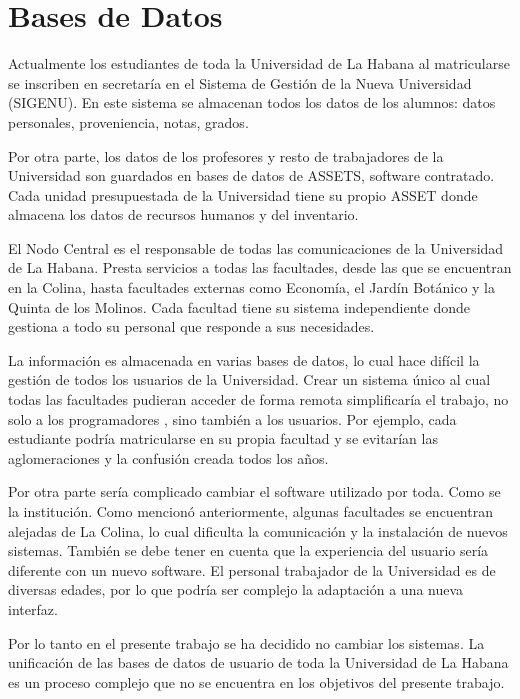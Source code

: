 \section*{Bases de Datos}

Actualmente los estudiantes de toda la Universidad de La Habana al matricularse se inscriben en secretaría en el Sistema de Gestión de la Nueva Universidad (SIGENU). En este sistema se almacenan todos los datos de los alumnos: datos personales, proveniencia, notas, grados.

Por otra parte, los datos de los profesores y resto de trabajadores de la Universidad son guardados en bases de datos de ASSETS, software contratado. Cada unidad presupuestada de la Universidad tiene su propio ASSET donde almacena los datos de recursos humanos y del inventario.

El Nodo Central es el responsable de todas las comunicaciones de la Universidad de La Habana. Presta servicios a todas las facultades, desde las que se encuentran en la Colina, hasta facultades externas como Economía, el Jardín Botánico y la Quinta de los Molinos. Cada facultad tiene su sistema independiente donde gestiona a todo su personal que responde a sus necesidades. 

La información es almacenada en varias bases de datos, lo cual hace difícil la gestión de todos los usuarios de la Universidad. Crear un sistema único al cual todas las facultades pudieran acceder de forma remota simplificaría el trabajo, no solo a los programadores , sino también a los usuarios. Por ejemplo, cada estudiante podría matricularse en su propia facultad y se evitarían las aglomeraciones y la confusión creada todos los años. 

Por otra parte sería complicado cambiar el software utilizado por toda. Como se  la institución. Como mencionó anteriormente, algunas facultades se encuentran alejadas de La Colina, lo cual dificulta la comunicación y la instalación de nuevos sistemas. También se debe tener en cuenta que la experiencia del usuario sería diferente con un nuevo software. El personal trabajador de la Universidad es de diversas edades, por lo que podría ser complejo la adaptación a una nueva interfaz.

Por lo tanto en el presente trabajo se ha decidido no cambiar los sistemas. La unificación de las bases de datos de usuario de toda la Universidad de La Habana es un proceso complejo que no se encuentra en los objetivos del presente trabajo. 

